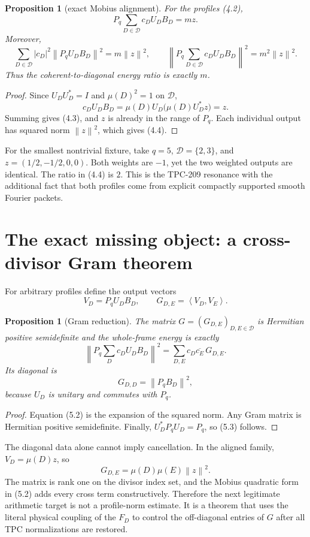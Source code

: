 \documentclass[11pt]{article}
\newtheorem{proposition}[theorem]{Proposition}
\newcommand{\cD}{\mathcal D}
\newcommand{\norm}[1]{\left\lVert #1\right\rVert}
\newcommand{\ip}[2]{\left\langle #1,#2\right\rangle}
\begin{document}
\begin{proposition}[exact Mobius alignment]
\label{prop:alignment}
For the profiles (4.2),
\[
 P_q\sum_{D\in\cD}c_DU_DB_D=mz.
 \tag{4.3}
\]
Moreover,
\[
 \sum_{D\in\cD}|c_D|^2\norm{P_qU_DB_D}^2
   =m\norm z^2,
 \qquad
 \norm{P_q\sum_{D\in\cD}c_DU_DB_D}^2
   =m^2\norm z^2.
 \tag{4.4}
\]
Thus the coherent-to-diagonal energy ratio is exactly $m$.
\end{proposition}

\begin{proof}
Since $U_DU_D^*=I$ and $\mu(D)^2=1$ on $\cD$,
\[
 c_DU_DB_D=\mu(D)U_D\bigl(\mu(D)U_D^*z\bigr)=z.
\]
Summing gives (4.3), and $z$ is already in the range of $P_q$.  Each
individual output has squared norm $\norm z^2$, which gives (4.4).
\end{proof}

For the smallest nontrivial fixture, take $q=5$, $\cD=\{2,3\}$, and
$z=(1/2,-1/2,0,0)$.  Both weights are $-1$, yet the two weighted outputs are
identical.  The ratio in (4.4) is $2$.  This is the TPC-209 resonance with the
additional fact that both profiles come from explicit compactly supported
smooth Fourier packets.

\section{The exact missing object: a cross-divisor Gram theorem}

For arbitrary profiles define the output vectors
\[
 V_D=P_qU_DB_D,
 \qquad
 G_{D,E}=\ip{V_D}{V_E}.
 \tag{5.1}
\]

\begin{proposition}[Gram reduction]
\label{prop:gram}
The matrix $G=(G_{D,E})_{D,E\in\cD}$ is Hermitian positive semidefinite and
the whole-frame energy is exactly
\[
 \norm{P_q\sum_Dc_DU_DB_D}^2
 =\sum_{D,E}c_D\overline{c_E}\,G_{D,E}.
 \tag{5.2}
\]
Its diagonal is
\[
 G_{D,D}=\norm{P_qB_D}^2,
 \tag{5.3}
\]
because $U_D$ is unitary and commutes with $P_q$.
\end{proposition}

\begin{proof}
Equation (5.2) is the expansion of the squared norm.  Any Gram matrix is
Hermitian positive semidefinite.  Finally, $U_D^*P_qU_D=P_q$, so (5.3)
follows.
\end{proof}

The diagonal data alone cannot imply cancellation.  In the aligned family,
$V_D=\mu(D)z$, so
\[
 G_{D,E}=\mu(D)\mu(E)\norm z^2.
 \tag{5.4}
\]
The matrix is rank one on the divisor index set, and the Mobius quadratic form
in (5.2) adds every cross term constructively.  Therefore the next legitimate
arithmetic target is not a profile-norm estimate.  It is a theorem that uses
the literal physical coupling of the $F_D$ to control the off-diagonal entries
of $G$ after all TPC normalizations are restored.
\end{document}

